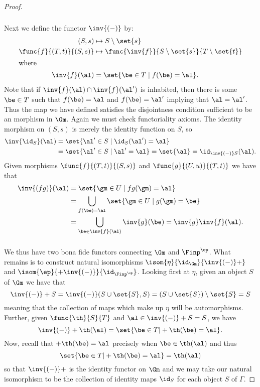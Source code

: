 \documentclass[main.tex]{subfiles}
\begin{document}
\begin{proof}
	\subparagraph{}
	Next we define the functor \(\inv{(-)}\) by:
	\begin{align*}
		(S,s)&\mapsto S\setminus\set{s} \\
		\func{f}{(T,t)}{(S,s)}&\mapsto\func{\inv{f}}{S\setminus\set{s}}{T\setminus\set{t}} \\
		\intertext{where}
		\inv{f}(\al)&=\set{\be\in T\mid f(\be)=\al}.
	\end{align*}
	Note that if \(\inv{f}(\al)\cap\inv{f}(\al')\) is inhabited, then there is
	some \(\be\in T\) such that \(f(\be)=\al\) and \(f(\be)=\al'\) implying that
	\(\al=\al'\). Thus the map we have defined satisfies the disjointness
	condition sufficient to be an morphism in \(\Gm\). Again we must check
	functoriality axioms. The identity morphism on \((S,s)\) is merely the
	identity function on \(S\), so
	\begin{align*}
		\inv{\id_S}(\al)
		&=\set{\al'\in S\mid\id_S(\al')=\al} \\
		&=\set{\al'\in S\mid\al'=\al}=\set{\al}=\id_{\inv{(-)}S}(\al).
	\end{align*}
	Given morphisms \(\func{f}{(T,t)}{(S,s)}\) and \(\func{g}{(U,u)}{(T,t)}\) we
	have that
	\begin{align*}
		\inv{(fg)}(\al)&=\set{\gm\in U\mid fg(\gm)=\al} \\
		&=\bigcup_{f(\be)=\al} \set{\gm\in U\mid g(\gm)=\be} \\
		&=\bigcup_{\be\in\inv{f}(\al)}\inv{g}(\be)
		=\inv{g}\inv{f}(\al).
	\end{align*}

	\subparagraph{}
	We thus have two bona fide functors connecting \(\Gm\) and \(\Finp^\op\).
	What remains is to construct natural isomorphisms
	\(\isom{\eta}{\id_\Gm}{\inv{(-)}+}\) and
	\(\isom{\ep}{+\inv{(-)}}{\id_{\Finp^\op}}\). Looking first at \(\eta\),
	given an object \(S\) of \(\Gm\) we have that
	\[\inv{(-)}+S=\inv{(-)}(S\cup\set{S},S)=(S\cup\set{S})\setminus\set{S}=S\]
	meaning that the collection of maps which make up \(\eta\) will be
	automorphisms. Further, given \(\func{\th}{S}{T}\) and
	\(\al\in\inv{(-)}+S=S\), we have
	\[\inv{(-)}+\th(\al)=\set{\be\in T|+\th(\be)=\al}.\] Now, recall that
	\(+\th(\be)=\al\) precisely when \(\be\in\th(\al)\) and thus
	\[\set{\be\in T|+\th(\be)=\al}=\th(\al)\] so that \(\inv{(-)}+\) is the
	identity functor on \(\Gm\) and we may take our natural isomorphism to be
	the collection of identity maps \(\id_S\) for each object \(S\) of
	\(\Gamma\).


\end{proof}
\end{document}
